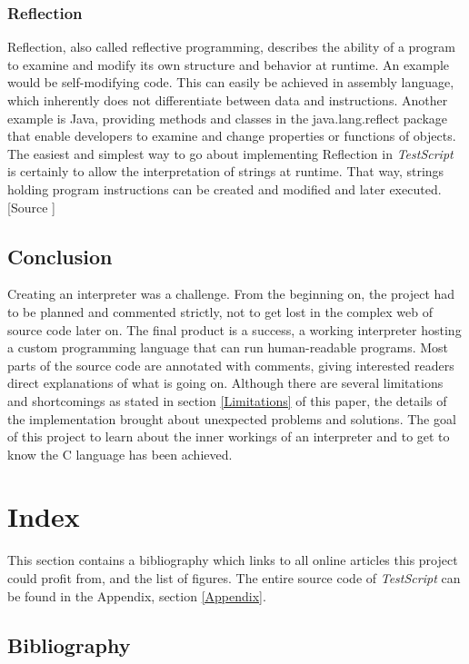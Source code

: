 \documentclass[12pt,a4paper]{article}
\newcommand{\name}{\emph{TestScript}}
\newcommand{\pagelabel}[1]{\phantomsection\label{#1}}
\begin{document}
\subsubsection{Reflection}
Reflection, also called reflective programming, describes
the ability of a program to examine and modify its own structure and behavior 
at runtime. An example would be self-modifying code. This can easily be
achieved in assembly language, which inherently does not differentiate between
data and instructions.
Another example is Java, providing methods and classes in the java.lang.reflect
package that enable developers to examine and change properties or functions
of objects.
The easiest and simplest way to go about implementing Reflection in \name{} is
certainly to allow the interpretation of strings at runtime. That way, strings
holding program instructions can be created and modified and later executed.
[Source ]

\subsection{Conclusion}
Creating an interpreter was a challenge. From the beginning on, the project
had to be planned and commented strictly, not to get lost in the complex web
of source code later on. The final product is a success, a working interpreter
hosting a custom programming language that can run human-readable programs.
Most parts of the source code are annotated with comments, giving interested
readers direct explanations of what is going on.
Although there are several limitations and shortcomings as stated in section \ref{Limitations}
of this paper, the details of the implementation brought about unexpected 
problems and solutions. The goal of this project to learn about 
the inner workings of an interpreter and
to get to know the C language has been achieved.


\section{Index}
This section contains a bibliography which links to all online articles
this project could profit from, and the list of figures.
The entire source code of \name{} can be found in the Appendix, section \ref{Appendix}.

\subsection{Bibliography}
\renewcommand*{\bibfont}{\normalsize}
\pagelabel{bibliography}\printbibliography[heading=none]
\end{document}

